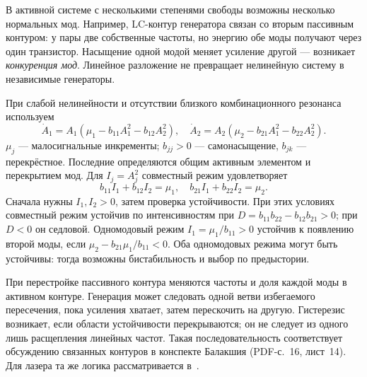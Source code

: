 В активной системе с несколькими степенями свободы возможны несколько нормальных мод. Например, LC-контур генератора связан со вторым пассивным контуром: у пары две собственные частоты, но энергию обе моды получают через один транзистор. Насыщение одной модой меняет усиление другой --- возникает \emph{конкуренция мод}. Линейное разложение не превращает нелинейную систему в независимые генераторы.

При слабой нелинейности и отсутствии близкого комбинационного резонанса используем
\begin{equation}\label{eq:modecompetition}
 \dot A_1=A_1(\mu_1-b_{11}A_1^2-b_{12}A_2^2),\quad
 \dot A_2=A_2(\mu_2-b_{21}A_1^2-b_{22}A_2^2).
\end{equation}
$\mu_j$ --- малосигнальные инкременты; $b_{jj}>0$ --- самонасыщение, $b_{jk}$ --- перекрёстное. Последние определяются общим активным элементом и перекрытием мод. Для $I_j=A_j^2$ совместный режим удовлетворяет
\begin{equation}
 b_{11}I_1+b_{12}I_2=\mu_1,\quad
 b_{21}I_1+b_{22}I_2=\mu_2.
\end{equation}
Сначала нужны $I_1,I_2>0$, затем проверка устойчивости. При этих условиях совместный режим устойчив по интенсивностям при $D=b_{11}b_{22}-b_{12}b_{21}>0$; при $D<0$ он седловой. Одномодовый режим $I_1=\mu_1/b_{11}>0$ устойчив к появлению второй моды, если $\mu_2-b_{21}\mu_1/b_{11}<0$. Оба одномодовых режима могут быть устойчивы: тогда возможны бистабильность и выбор по предыстории.

При перестройке пассивного контура меняются частоты и доля каждой моды в активном контуре. Генерация может следовать одной ветви избегаемого пересечения, пока усиления хватает, затем перескочить на другую. Гистерезис возникает, если области устойчивости перекрываются; он не следует из одного лишь расщепления линейных частот. Такая последовательность соответствует обсуждению связанных контуров в конспекте Балакшия (PDF-с.~16, лист~14). Для лазера та же логика рассматривается в~.
